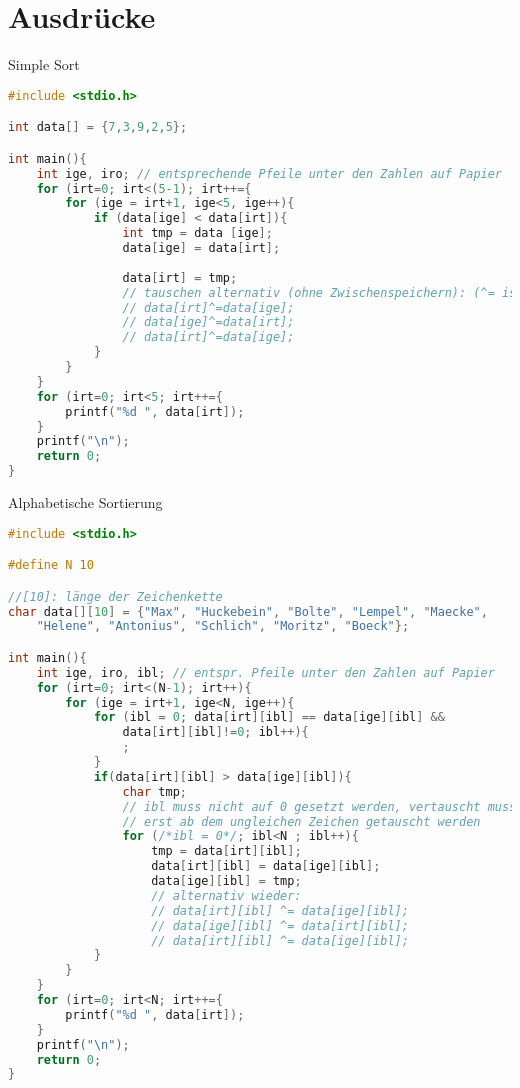 \section{Ausdrücke}

Simple Sort

\begin{lstlisting}[language=C]
#include <stdio.h>

int data[] = {7,3,9,2,5};

int main(){
	int ige, iro; // entsprechende Pfeile unter den Zahlen auf Papier
	for (irt=0; irt<(5-1); irt++={
		for (ige = irt+1, ige<5, ige++){
			if (data[ige] < data[irt]){
				int tmp = data [ige];
				data[ige] = data[irt];
				
				data[irt] = tmp;
				// tauschen alternativ (ohne Zwischenspeichern): (^= ist XOR)
				// data[irt]^=data[ige];
				// data[ige]^=data[irt];
				// data[irt]^=data[ige];
			}
		}	
	}
	for (irt=0; irt<5; irt++={
		printf("%d ", data[irt]);
	}
	printf("\n");
	return 0;
}
\end{lstlisting}

Alphabetische Sortierung

\begin{lstlisting}[language=C]
#include <stdio.h>

#define N 10

//[10]: länge der Zeichenkette
char data[][10] = {"Max", "Huckebein", "Bolte", "Lempel", "Maecke", 
	"Helene", "Antonius", "Schlich", "Moritz", "Boeck"};

int main(){
	int ige, iro, ibl; // entspr. Pfeile unter den Zahlen auf Papier
	for (irt=0; irt<(N-1); irt++){
		for (ige = irt+1, ige<N, ige++){
			for (ibl = 0; data[irt][ibl] == data[ige][ibl] && 
				data[irt][ibl]!=0; ibl++){
				;
			}
			if(data[irt][ibl] > data[ige][ibl]){
				char tmp;
				// ibl muss nicht auf 0 gesetzt werden, vertauscht muss sowieso
				// erst ab dem ungleichen Zeichen getauscht werden
				for (/*ibl = 0*/; ibl<N ; ibl++){
					tmp = data[irt][ibl];
					data[irt][ibl] = data[ige][ibl];
					data[ige][ibl] = tmp;
					// alternativ wieder:
					// data[irt][ibl] ^= data[ige][ibl];
					// data[ige][ibl] ^= data[irt][ibl];
					// data[irt][ibl] ^= data[ige][ibl];
			}
		}	
	}
	for (irt=0; irt<N; irt++={
		printf("%d ", data[irt]);
	}
	printf("\n");
	return 0;
}
\end{lstlisting}

